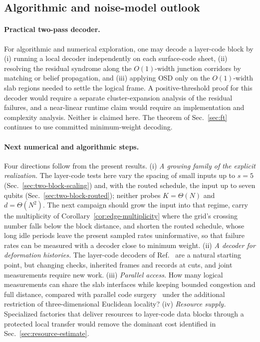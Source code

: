\documentclass[aps,prx,reprint,superscriptaddress,nofootinbib,floatfix,longbibliography]{revtex4-2}
\theoremstyle{definition}
\begin{document}
\subsection{Algorithmic and noise-model outlook}
\label{sec:decoder-noise}
\paragraph{Practical two-pass decoder.}
For algorithmic and numerical exploration, one may decode a layer-code block by (i) running a local decoder independently on each surface-code sheet, (ii) resolving the residual syndrome along the $O(1)$-width junction corridors by matching or belief propagation, and (iii) applying OSD only on the $O(1)$-width slab regions needed to settle the logical frame.  A positive-threshold proof for this decoder would require a separate cluster-expansion analysis of the residual failures, and a near-linear runtime claim would require an implementation and complexity analysis.  Neither is claimed here.  The theorem of Sec.~\ref{sec:ft} continues to use committed minimum-weight decoding.

\paragraph{Next numerical and algorithmic steps.}
Four directions follow from the present results.  (i) \emph{A growing family
of the explicit realization.}  The layer-code tests here vary the spacing of
small inputs up to $s=5$ (Sec.~\ref{sec:two-block-scaling}) and, with the
routed schedule, the input up to seven qubits
(Sec.~\ref{sec:two-block-routed}); neither probes $K=\Theta(N)$ and
$d=\Theta(N^2)$.  The next campaign should grow the input into that regime,
carry the multiplicity of Corollary~\ref{cor:edge-multiplicity} where the
grid's crossing number falls below the block distance, and shorten the routed
schedule, whose long idle periods leave the present sampled rates
uninformative, so that failure rates can be measured with a decoder close to
minimum weight.  (ii) \emph{A decoder
for deformation histories.}  The layer-code decoders of
Ref.~\cite{GuRandomLayerCodes2026} are a natural starting point, but changing
checks, inherited frames and records at cuts, and joint measurements require
new work.  (iii) \emph{Parallel access.}  How many logical measurements can
share the slab interfaces while keeping bounded congestion and full distance,
compared with parallel code surgery~\cite{CowtanParallelSurgery} under the
additional restriction of three-dimensional Euclidean locality?
(iv) \emph{Resource supply.}  Specialized factories that deliver resources to
layer-code data blocks through a protected local transfer would remove the
dominant cost identified in Sec.~\ref{sec:resource-estimate}.
\end{document}
